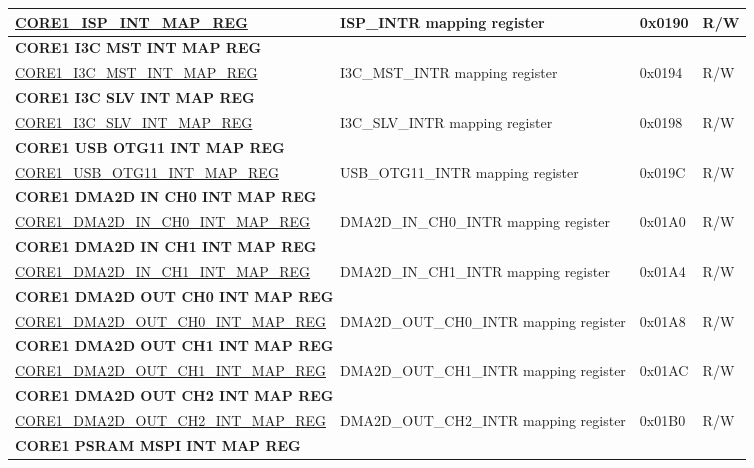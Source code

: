 \begin{longtable}{ | p{7.5cm} | p{7.2cm} | p{1.3cm} | p{1cm} | }
\hyperref[regdesc:CORE1ISPINTMAPREG]{CORE1\_ISP\_INT\_MAP\_REG} & ISP\_INTR mapping register & 0x0190 & R/W \\ \hline
\multicolumn{4}{|l|}{\textbf{CORE1 I3C MST INT MAP REG}} \\ \hline
\hyperref[regdesc:CORE1I3CMSTINTMAPREG]{CORE1\_I3C\_MST\_INT\_MAP\_REG} & I3C\_MST\_INTR mapping register & 0x0194 & R/W \\ \hline
\multicolumn{4}{|l|}{\textbf{CORE1 I3C SLV INT MAP REG}} \\ \hline
\hyperref[regdesc:CORE1I3CSLVINTMAPREG]{CORE1\_I3C\_SLV\_INT\_MAP\_REG} & I3C\_SLV\_INTR mapping register & 0x0198 & R/W \\ \hline
\multicolumn{4}{|l|}{\textbf{CORE1 USB OTG11 INT MAP REG}} \\ \hline
\hyperref[regdesc:CORE1USBOTG11INTMAPREG]{CORE1\_USB\_OTG11\_INT\_MAP\_REG} & USB\_OTG11\_INTR mapping register & 0x019C & R/W \\ \hline
\multicolumn{4}{|l|}{\textbf{CORE1 DMA2D IN CH0 INT MAP REG}} \\ \hline
\hyperref[regdesc:CORE1DMA2DINCH0INTMAPREG]{CORE1\_DMA2D\_IN\_CH0\_INT\_MAP\_REG} & DMA2D\_IN\_CH0\_INTR mapping register & 0x01A0 & R/W \\ \hline
\multicolumn{4}{|l|}{\textbf{CORE1 DMA2D IN CH1 INT MAP REG}} \\ \hline
\hyperref[regdesc:CORE1DMA2DINCH1INTMAPREG]{CORE1\_DMA2D\_IN\_CH1\_INT\_MAP\_REG} & DMA2D\_IN\_CH1\_INTR mapping register & 0x01A4 & R/W \\ \hline
\multicolumn{4}{|l|}{\textbf{CORE1 DMA2D OUT CH0 INT MAP REG}} \\ \hline
\hyperref[regdesc:CORE1DMA2DOUTCH0INTMAPREG]{CORE1\_DMA2D\_OUT\_CH0\_INT\_MAP\_REG} & DMA2D\_OUT\_CH0\_INTR mapping register & 0x01A8 & R/W \\ \hline
\multicolumn{4}{|l|}{\textbf{CORE1 DMA2D OUT CH1 INT MAP REG}} \\ \hline
\hyperref[regdesc:CORE1DMA2DOUTCH1INTMAPREG]{CORE1\_DMA2D\_OUT\_CH1\_INT\_MAP\_REG} & DMA2D\_OUT\_CH1\_INTR mapping register & 0x01AC & R/W \\ \hline
\multicolumn{4}{|l|}{\textbf{CORE1 DMA2D OUT CH2 INT MAP REG}} \\ \hline
\hyperref[regdesc:CORE1DMA2DOUTCH2INTMAPREG]{CORE1\_DMA2D\_OUT\_CH2\_INT\_MAP\_REG} & DMA2D\_OUT\_CH2\_INTR mapping register & 0x01B0 & R/W \\ \hline
\multicolumn{4}{|l|}{\textbf{CORE1 PSRAM MSPI INT MAP REG}} \\ \hline

\end{longtable}
